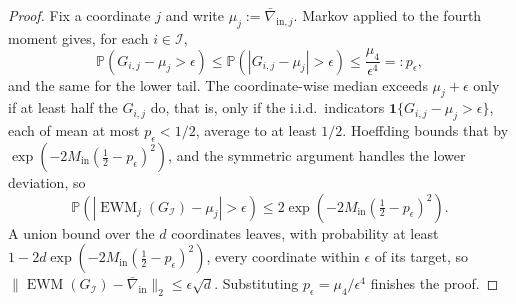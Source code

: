 \documentclass[10pt]{article} %
\theoremstyle{plain}
\theoremstyle{definition}
\begin{document}
\begin{proof}
Fix a coordinate $j$ and write $\mu_j:=\bar\nabla_{\mathrm{in},j}$. Markov applied to the fourth moment
gives, for each $i\in\mathcal I$,
\[
\mathbb P(G_{i,j}-\mu_j>\epsilon)\le\mathbb P(|G_{i,j}-\mu_j|>\epsilon)\le\frac{\mu_4}{\epsilon^4}=:p_\epsilon,
\]
and the same for the lower tail. The coordinate-wise median exceeds $\mu_j+\epsilon$ only if at least half
the $G_{i,j}$ do, that is, only if the i.i.d.\ indicators $\mathbf 1\{G_{i,j}-\mu_j>\epsilon\}$, each of mean
at most $p_\epsilon<1/2$, average to at least $1/2$. Hoeffding bounds that by
$\exp(-2M_{\mathrm{in}}(\tfrac12-p_\epsilon)^2)$, and the symmetric argument handles the lower deviation, so
\[
\mathbb P\!\left(|\operatorname{EWM}_j(G_{\mathcal I})-\mu_j|>\epsilon\right)
\le2\exp\!\left(-2M_{\mathrm{in}}(\tfrac12-p_\epsilon)^2\right).
\]
A union bound over the $d$ coordinates leaves, with probability at least
$1-2d\exp(-2M_{\mathrm{in}}(\tfrac12-p_\epsilon)^2)$, every coordinate within $\epsilon$ of its target, so
$\|\operatorname{EWM}(G_{\mathcal I})-\bar\nabla_{\mathrm{in}}\|_2\le\epsilon\sqrt d$. Substituting
$p_\epsilon=\mu_4/\epsilon^4$ finishes the proof.
\end{proof}
\end{document}
